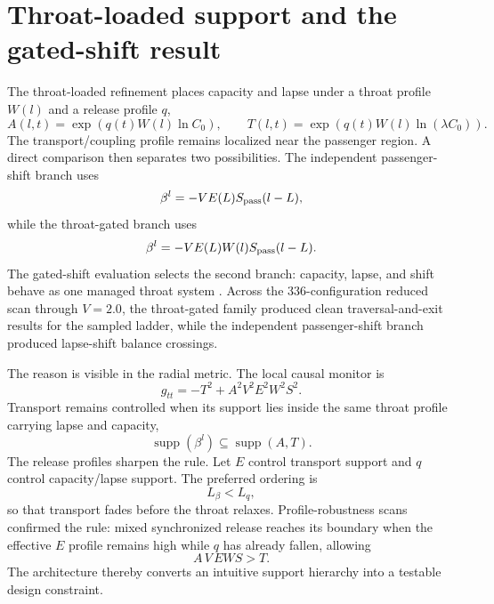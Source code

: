 \documentclass[11pt]{article}
\newcommand{\supp}{\operatorname{supp}}
\begin{document}
\section{Throat-loaded support and the gated-shift result}
The throat-loaded refinement places capacity and lapse under a throat profile $W(l)$ and a release profile $q$,
\begin{equation}
 A(l,t)=\exp\!\left(q(t)W(l)\ln C_0\right),
 \qquad
 T(l,t)=\exp\!\left(q(t)W(l)\ln(\lambda C_0)\right).
 \label{eq:A_T_throat}
\end{equation}
The transport/coupling profile remains localized near the passenger region.  A direct comparison then separates two possibilities.  The independent passenger-shift branch uses
\begin{equation}
 \beta^l=-V E(L)S_{\rm pass}(l-L),
\end{equation}
while the throat-gated branch uses
\begin{equation}
 \beta^l=-V E(L)W(l)S_{\rm pass}(l-L).
 \label{eq:old_gated_shift}
\end{equation}
The gated-shift evaluation selects the second branch: capacity, lapse, and shift behave as one managed throat system \citep{goldman_throat_gated_report}.  Across the 336-configuration reduced scan through $V=2.0$, the throat-gated family produced clean traversal-and-exit results for the sampled ladder, while the independent passenger-shift branch produced lapse-shift balance crossings.

The reason is visible in the radial metric.  The local causal monitor is
\begin{equation}
 g_{tt}=-T^2+A^2V^2E^2W^2S^2.
 \label{eq:gtt_basic}
\end{equation}
Transport remains controlled when its support lies inside the same throat profile carrying lapse and capacity,
\begin{equation}
 \supp(\beta^l)\subseteq \supp(A,T).
\end{equation}
The release profiles sharpen the rule.  Let $E$ control transport support and $q$ control capacity/lapse support.  The preferred ordering is
\begin{equation}
 L_\beta<L_q,
\end{equation}
so that transport fades before the throat relaxes.  Profile-robustness scans confirmed the rule: mixed synchronized release reaches its boundary when the effective $E$ profile remains high while $q$ has already fallen, allowing
\begin{equation}
 A\,V\,EWS>T.
\end{equation}
The architecture thereby converts an intuitive support hierarchy into a testable design constraint.
\end{document}
